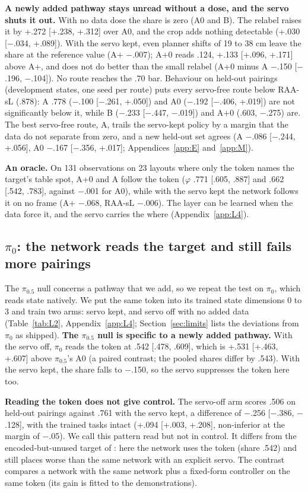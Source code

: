 \documentclass{article}
\newcommand{\mi}{$-$}
\newcommand{\pifive}{$\pi_{0.5}$}
\newcommand{\pizero}{$\pi_0$}
\begin{document}
\textbf{A newly added pathway stays unread without a dose, and the servo shuts it out.} With no data dose the share is zero (A0 and B). The relabel raises it by +.272 [+.238, +.312] over A0, and the crop adds nothing detectable (+.030 [\mi.034, +.089]). With the servo kept, even planner shifts of 19 to 38 cm leave the share at the reference value (A+ \mi.007); A+0 reads .124, +.133 [+.096, +.171] above A+, and does not do better than the small relabel (A+0 minus A \mi.150 [\mi.196, \mi.104]). No route reaches the .70 bar. Behaviour on held-out pairings (development states, one seed per route) puts every servo-free route below RAA-sL (.878): A .778 (\mi.100 [\mi.261, +.050]) and A0 (\mi.192 [\mi.406, +.019]) are not significantly below it, while B (\mi.233 [\mi.447, \mi.019]) and A+0 (.603, \mi.275) are. The best servo-free route, A, trails the servo-kept policy by a margin that the data do not separate from zero, and a new held-out set agrees (A \mi.086 [\mi.244, +.056], A0 \mi.167 [\mi.356, +.017]; Appendices~\ref{app:E} and~\ref{app:M}).

\textbf{An oracle.} On 131 observations on 23 layouts where only the token names the target's table spot, A+0 and A follow the token ($\varphi$ .771 [.605, .887] and .662 [.542, .783], against \mi.001 for A0), while with the servo kept the network follows it on no frame (A+ \mi.068, RAA-sL \mi.006). The layer can be learned when the data force it, and the servo carries the where (Appendix~\ref{app:L4}).

\subsection{\pizero: the network reads the target and still fails more pairings}
\label{sec:pi0}

The \pifive{} null concerns a pathway that we add, so we repeat the test on \pizero, which reads state natively. We put the same token into its trained state dimensions 0 to 3 and train two arms: servo kept, and servo off with no added data (Table~\ref{tab:L2}, Appendix~\ref{app:L4}; Section~\ref{sec:limits} lists the deviations from \pizero{} as shipped).
\textbf{The \pifive{} null is specific to a newly added pathway.} With the servo off, \pizero{} reads the token at .542 [.478, .609], which is +.531 [+.463, +.607] above \pifive's A0 (a paired contrast; the pooled shares differ by .543). With the servo kept, the share falls to \mi.150, so the servo suppresses the token here too.

\textbf{Reading the token does not give control.} The servo-off arm scores .506 on held-out pairings against .761 with the servo kept, a difference of \mi.256 [\mi.386, \mi.128], with the trained tasks intact (+.094 [+.003, +.208], non-inferior at the margin of \mi.05). We call this pattern read but not in control. It differs from the encoded-but-unused target of \citet{jiang2610}: here the network uses the token (share .542) and still places worse than the same network with an explicit servo. The contrast compares a network with the same network plus a fixed-form controller on the same token (its gain is fitted to the demonstrations).
\end{document}
